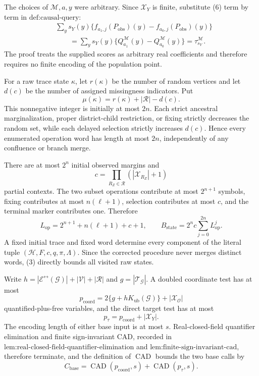 The choices of \(\mathcal M,a,y\) were arbitrary. Since \(\mathcal X_Y\) is finite, substitute (6) term by term in \(\text{def:causal-query}\):
\[
\begin{aligned}
&\sum_y s_Y(y)
\{f_{a_1,j}(P_{\mathrm{obs}})(y)-f_{a_0,j}(P_{\mathrm{obs}})(y)\}\\
&\qquad=\sum_y s_Y(y)
\{Q_{a_1}^{\mathcal M}(y)-Q_{a_0}^{\mathcal M}(y)\}
=\tau_{s_Y}^{\mathcal M}.
\end{aligned}
\tag{7}
\]
The proof treats the supplied scores as arbitrary real coefficients and therefore requires no finite encoding of the population point.

For a raw trace state \(\kappa\), let \(r(\kappa)\) be the number of random vertices and let \(d(c)\) be the number of assigned missingness indicators. Put
\[
\mu(\kappa)=r(\kappa)+|\mathcal R|-d(c).
\tag{1}
\]
This nonnegative integer is initially at most \(2n\). Each strict ancestral marginalization, proper district-child restriction, or fixing strictly decreases the random set, while each delayed selection strictly increases \(d(c)\). Hence every enumerated operation word has length at most \(2n\), independently of any confluence or branch merge.

There are at most \(2^n\) initial observed margins and
\[
c=\prod_{R_Z\in\mathcal R}(|\mathcal X_{R_Z}|+1)
\tag{2}
\]
partial contexts. The two subset operations contribute at most \(2^{n+1}\) symbols, fixing contributes at most \(n(\ell+1)\), selection contributes at most \(c\), and the terminal marker contributes one. Therefore
\[
L_{\mathrm{op}}=2^{n+1}+n(\ell+1)+c+1,
\qquad
B_{\mathrm{state}}=2^n c\sum_{j=0}^{2n}L_{\mathrm{op}}^j.
\tag{3}
\]
A fixed initial trace and fixed word determine every component of the literal tuple \((\mathcal H,F,c,q,\pi,\Lambda)\). Since the corrected procedure never merges distinct words, (3) directly bounds all visited raw states.

Write \(h=|\mathcal E^{\leftrightarrow}(\mathcal G)|+|\mathcal V|+|\mathcal R|\) and \(g=|\mathcal T_{\mathcal G}|\). A doubled coordinate test has at most
\[
p_{\mathrm{coord}}=2\{g+hK_{\mathrm{ub}}(\mathcal G)\}+|\mathcal X_{\mathcal O}|
\tag{4}
\]
quantified-plus-free variables, and the direct target test has at most
\[
p_{\tau}=p_{\mathrm{coord}}+|\mathcal X_Y|.
\tag{5}
\]
The encoding length of either base input is at most \(s\). Real-closed-field quantifier elimination and finite sign-invariant CAD, recorded in \(\text{lem:real-closed-field-quantifier-elimination}\) and \(\text{lem:finite-sign-invariant-cad}\), therefore terminate, and the definition of \(\operatorname{CAD}\) bounds the two base calls by
\[
C_{\mathrm{base}}
=\operatorname{CAD}(p_{\mathrm{coord}},s)
+\operatorname{CAD}(p_{\tau},s).
\tag{6}
\]


